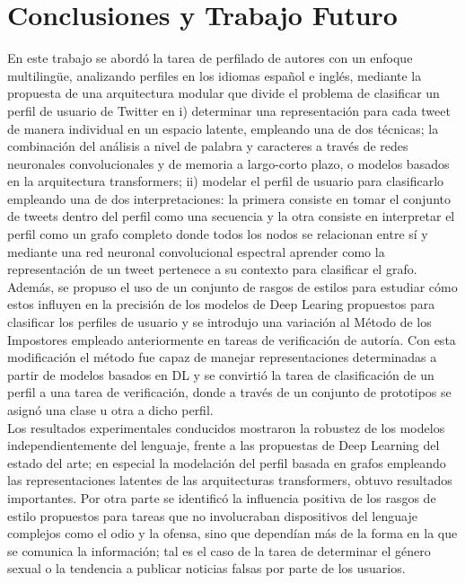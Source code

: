 \chapter*{Conclusiones y Trabajo Futuro}

En este trabajo se abordó la tarea de perfilado de autores con un enfoque multilingüe, analizando perfiles en los idiomas español e inglés, mediante la propuesta de una arquitectura modular que divide el problema de clasificar un perfil de usuario de Twitter en i) determinar una representación para cada tweet de manera individual en un espacio latente, empleando una de dos técnicas; la combinación del análisis a nivel de palabra y caracteres a través de redes neuronales convolucionales y de memoria a largo-corto plazo, o modelos basados en la arquitectura transformers; ii) modelar el perfil de usuario para clasificarlo empleando una de dos interpretaciones: la primera consiste en tomar el conjunto de tweets dentro del perfil como una secuencia y la otra consiste en interpretar el perfil como un grafo completo donde todos los nodos se relacionan entre sí y mediante una red neuronal convolucional espectral aprender como la representación de un tweet pertenece a su contexto para clasificar el grafo.
\\
Además, se propuso el uso de un conjunto de rasgos de estilos para estudiar cómo estos influyen en la precisión de los modelos de Deep Learing propuestos para clasificar los perfiles de usuario y se introdujo una variación al Método de los Impostores empleado anteriormente en tareas de verificación de autoría. Con esta modificación el método fue capaz de manejar representaciones determinadas a partir de modelos basados en DL y se convirtió la tarea de clasificación de un perfil a una tarea de verificación, donde a través de un conjunto de prototipos se asignó una clase u otra a dicho perfil.  
\\
Los resultados experimentales conducidos mostraron la robustez de los modelos independientemente del lenguaje, frente a las propuestas de Deep Learning del estado del arte; en especial la modelación del perfil basada en grafos empleando las representaciones latentes de las arquitecturas transformers, obtuvo resultados importantes. Por otra parte se identificó la influencia positiva de los rasgos de estilo propuestos para tareas que no involucraban dispositivos del lenguaje complejos como el odio y la ofensa, sino que dependían más de la forma en la que se comunica la información; tal es el caso de la tarea de determinar el género sexual o la tendencia a publicar noticias falsas por parte de los usuarios.
